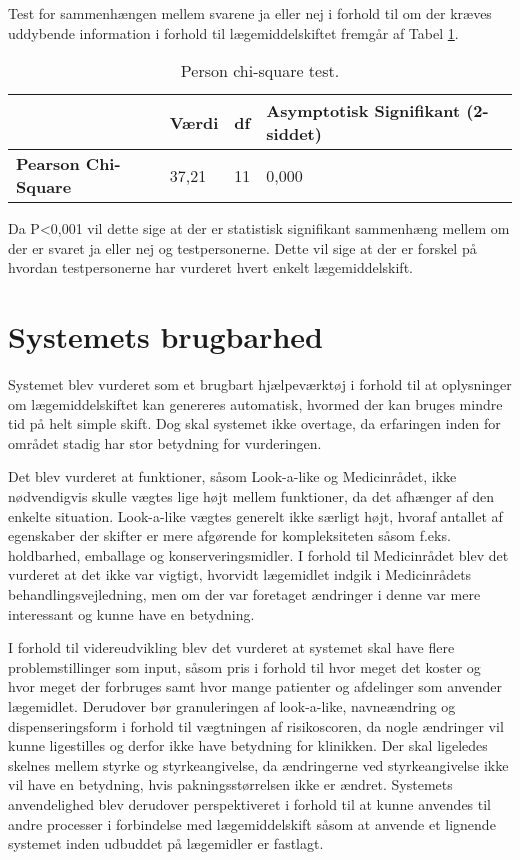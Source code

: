 Test for sammenhængen mellem svarene ja eller nej i forhold til om der kræves uddybende information i forhold til lægemiddelskiftet fremgår af Tabel \ref{table:test2}.

\begin{table}[H]
\caption{Person chi-square test.}
\vspace{2mm}
\label{table:test2}
\centering
\begin{tabular}{l|p{2cm}|p{2cm}|p{4.5cm}}
\cellcolor[HTML]{C0C0C0}\textbf{} & \cellcolor[HTML]{C0C0C0}\textbf{Værdi} & \cellcolor[HTML]{C0C0C0}\textbf{df} & \cellcolor[HTML]{C0C0C0}\textbf{Asymptotisk Signifikant (2-siddet)} \\ \hline
\cellcolor[HTML]{C0C0C0}\textbf{Pearson Chi-Square} & 37,21 & 11 & 0,000 \\
\end{tabular}
\end{table}

Da P<0,001  vil dette sige at der er statistisk signifikant sammenhæng mellem om der er svaret ja eller nej og testpersonerne. Dette vil sige at der er forskel på hvordan testpersonerne har vurderet hvert enkelt lægemiddelskift.


\section{Systemets brugbarhed}
Systemet blev vurderet som et brugbart hjælpeværktøj i forhold til at oplysninger om lægemiddelskiftet kan genereres automatisk, hvormed der kan bruges mindre tid på helt simple skift. Dog skal systemet ikke overtage, da erfaringen inden for området stadig har stor betydning for vurderingen. 

Det blev vurderet at funktioner, såsom Look-a-like og Medicinrådet, ikke nødvendigvis skulle vægtes lige højt mellem funktioner, da det afhænger af den enkelte situation. Look-a-like vægtes generelt ikke særligt højt, hvoraf antallet af egenskaber der skifter er mere afgørende for kompleksiteten såsom f.eks. holdbarhed, emballage og konserveringsmidler. I forhold til Medicinrådet blev det vurderet at det ikke var vigtigt, hvorvidt lægemidlet indgik i Medicinrådets behandlingsvejledning, men om der var foretaget ændringer i denne var mere interessant og kunne have en betydning. 

I forhold til videreudvikling blev det vurderet at systemet skal have flere problemstillinger som input, såsom pris i forhold til hvor meget det koster og hvor meget der forbruges samt hvor mange patienter og afdelinger som anvender lægemidlet. Derudover bør granuleringen af look-a-like, navneændring og dispenseringsform i forhold til vægtningen af risikoscoren, da nogle ændringer vil kunne ligestilles og derfor ikke have betydning for klinikken. Der skal ligeledes skelnes mellem styrke og styrkeangivelse, da ændringerne ved styrkeangivelse ikke vil have en betydning, hvis pakningsstørrelsen ikke er ændret. Systemets anvendelighed blev derudover perspektiveret i forhold til at kunne anvendes til andre processer i forbindelse med lægemiddelskift såsom at anvende et lignende systemet inden udbuddet på lægemidler er fastlagt.




